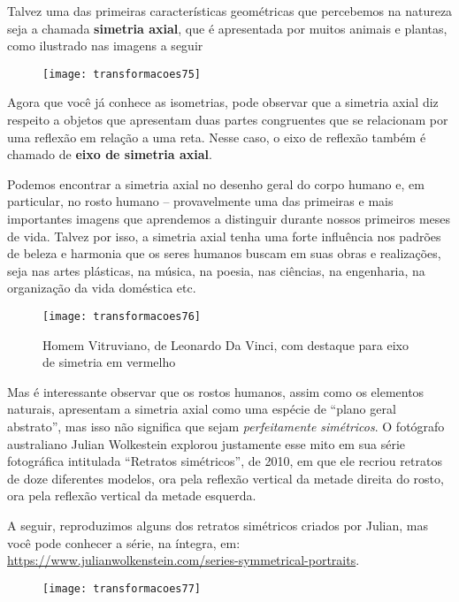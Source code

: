 Talvez uma das primeiras características geométricas que percebemos na natureza seja a chamada \textbf{simetria axial}, que é apresentada por muitos animais e plantas, como ilustrado nas imagens a seguir

\begin{figure}[H]
\centering

\texttt{[image: transformacoes75]}
\end{figure}

Agora que você já conhece as isometrias, pode observar que a simetria axial diz respeito a objetos que apresentam duas partes congruentes que se relacionam por uma reflexão em relação a uma reta. Nesse caso, o eixo de reflexão também é chamado de \textbf{eixo de simetria axial}.

Podemos encontrar a simetria axial no desenho geral do corpo humano e, em particular, no rosto humano – provavelmente uma das primeiras e mais importantes imagens que aprendemos a distinguir durante nossos primeiros meses de vida. 	Talvez por isso, a simetria axial tenha uma forte influência nos padrões de beleza e harmonia que os seres humanos buscam em suas obras e realizações, seja nas artes plásticas, na música, na poesia, nas ciências, na engenharia, na organização da vida doméstica etc. 

\begin{figure}[H]
\centering

\texttt{[image: transformacoes76]}
\caption{Homem Vitruviano, de Leonardo Da Vinci, com destaque para eixo de simetria em vermelho}
\end{figure}
 
Mas é interessante observar que os rostos humanos, assim como os elementos naturais, apresentam a simetria axial como uma espécie de “plano geral abstrato”, mas isso não significa que sejam \textit{perfeitamente simétricos}. O fotógrafo australiano Julian Wolkestein explorou justamente esse mito em sua série fotográfica intitulada “Retratos simétricos”, de 2010, em que ele recriou retratos de doze diferentes modelos, ora pela reflexão vertical da metade direita do rosto, ora pela reflexão vertical da metade esquerda. 

A seguir, reproduzimos alguns dos retratos simétricos criados por Julian, mas você pode conhecer a série, na íntegra, em: \url{https://www.julianwolkenstein.com/series-symmetrical-portraits}.
 
\begin{figure}[H]
\centering

\texttt{[image: transformacoes77]}
\end{figure}

